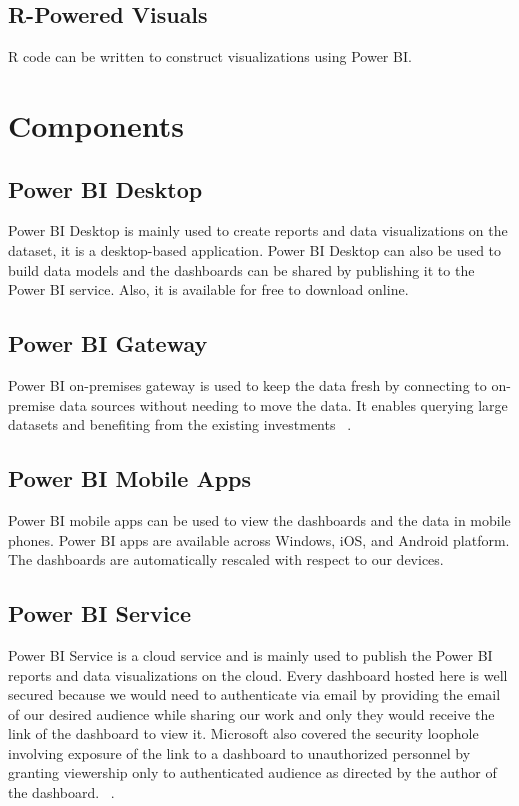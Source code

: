 \subsection{R-Powered Visuals}
R code can be written to construct visualizations using Power BI.

\section{Components}

\subsection{Power BI Desktop}
Power BI Desktop is mainly used to create reports and data visualizations on
the dataset, it is a desktop-based application. Power BI Desktop can also be used to 
build data models and the dashboards can be shared by publishing it to the Power BI service. 
Also, it is available for free to download online.

\subsection{Power BI Gateway}
Power BI on-premises gateway is used to keep the data fresh 
by connecting to on-premise data sources without needing to move the data. It 
enables querying large datasets and benefiting from the existing investments
~\cite{hid-sp18-418-powerbi-components}.

\subsection{Power BI Mobile Apps}
Power BI mobile apps can be used to view the dashboards and the data in mobile 
phones. Power BI apps are available across Windows, iOS, and Android platform. 
The dashboards are automatically rescaled with respect to our devices.

\subsection{Power BI Service}
Power BI Service is a cloud service and is mainly used to publish the 
Power BI reports and data visualizations on the cloud. Every dashboard hosted 
here is well secured because we would need to authenticate via email by providing 
the email of our desired audience while sharing our work and only they would receive the 
link of the dashboard to view it. Microsoft also covered the security loophole involving exposure 
of the link to a dashboard to unauthorized personnel by granting viewership only to 
authenticated audience as directed by the author of the dashboard.
~\cite{hid-sp18-418-powerbi-components}.

